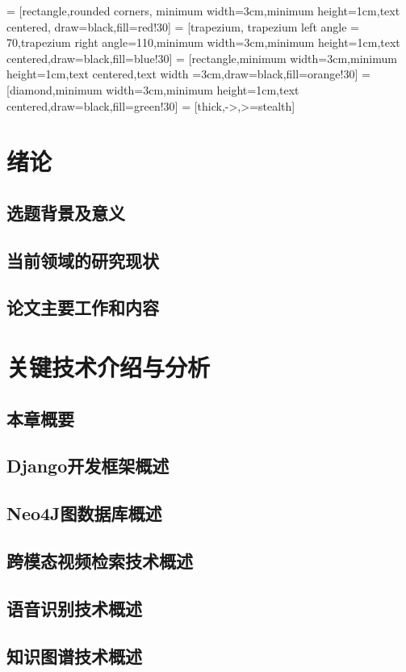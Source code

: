 \documentclass[12pt,a4paper,fancyhdr,openany,oneside]{ctexbook}
\begin{document}
 = [rectangle,rounded corners, minimum width=3cm,minimum height=1cm,text centered, draw=black,fill=red!30]
 = [trapezium, trapezium left angle = 70,trapezium right angle=110,minimum width=3cm,minimum height=1cm,text centered,draw=black,fill=blue!30]
 = [rectangle,minimum width=3cm,minimum height=1cm,text centered,text width =3cm,draw=black,fill=orange!30]
 = [diamond,minimum width=3cm,minimum height=1cm,text centered,draw=black,fill=green!30]
 = [thick,->,>=stealth]


\tableofcontents


\chapter{绪论}
\section{选题背景及意义}
\section{当前领域的研究现状}
\section{论文主要工作和内容}

\chapter{关键技术介绍与分析}
\section{本章概要}
\section{Django开发框架概述}
\section{Neo4J图数据库概述}
\section{跨模态视频检索技术概述}
\section{语音识别技术概述}
\section{知识图谱技术概述}
\end{document}
